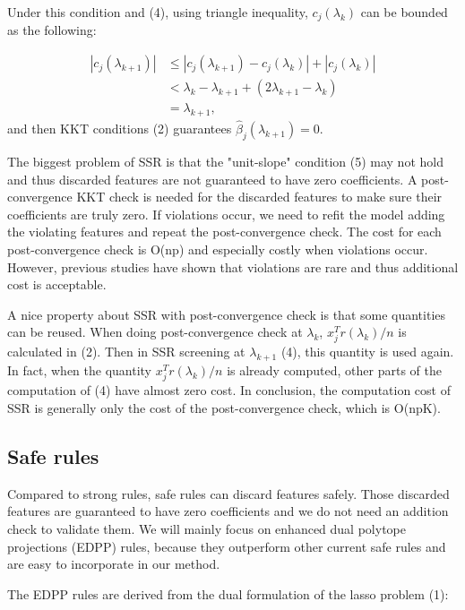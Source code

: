 \documentclass{article}
\begin{document}
Under this condition and (4), using triangle inequality, $c_j(\lambda_k)$ can be bounded as the following:

\begin{equation}
    \begin{split}
        |c_j(\lambda_{k+1})| &\leq |c_j(\lambda_{k+1})-c_j(\lambda_k)| + |c_j(\lambda_k)|\\
    &< \lambda_k - \lambda_{k+1} + (2\lambda_{k+1}-\lambda_k)\\
    &=\lambda_{k+1},
    \end{split}
\end{equation}
and then KKT conditions (2) guarantees $\hat{\beta}_j(\lambda_{k+1})=0$.

The biggest problem of SSR is that the "unit-slope" condition (5) may not hold and thus discarded features are not guaranteed to have zero coefficients. A post-convergence KKT check is needed for the discarded features to make sure their coefficients are truly zero. If violations occur, we need to refit the model adding the violating features and repeat the post-convergence check. The cost for each post-convergence check is O(np) and especially costly when violations occur. However, previous studies have shown that violations are rare and thus additional cost is acceptable.

A nice property about SSR with post-convergence check is that some quantities can be reused. When doing post-convergence check at $\lambda_k$, $x_j^Tr(\lambda_k)/n$ is calculated in (2). Then in SSR screening at $\lambda_{k+1}$ (4), this quantity is used again. In fact, when the quantity $x_j^Tr(\lambda_k)/n$ is already computed, other parts of the computation of (4) have almost zero cost. In conclusion, the computation cost of SSR is generally only the cost of the post-convergence check, which is O(npK).

\subsection{Safe rules}

Compared to strong rules, safe rules can discard features safely. Those discarded features are guaranteed to have zero coefficients and we do not need an addition check to validate them. We will mainly focus on enhanced dual polytope projections (EDPP) rules\cite{wang2013lasso}, because they outperform other current safe rules and are easy to incorporate in our method.

The EDPP rules are derived from the dual formulation of the lasso problem (1):
\end{document}
